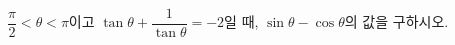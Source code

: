 $\dfrac{\pi}{2}<\theta<\pi$이고 $\tan\theta+\dfrac{1}{\tan\theta}=-2$일 때, $\sin\theta-\cos\theta$의 값을 구하시오.
